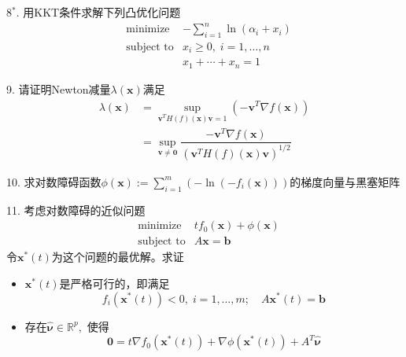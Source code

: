 
\begin{frame}

8$^*$. 用KKT条件求解下列凸优化问题
\begin{eqnarray*}
& \text{minimize} & -\sum\limits_{i=1}^n \ln(\alpha_i + x_i) \\
& \text{subject to} & x_i \ge 0,\; i=1,\ldots,n \\
& & x_1+\cdots+x_n = 1
\end{eqnarray*}

\vspace{1em}

9. 请证明Newton减量$\lambda(\mathbf{x})$满足
\begin{align*}
\lambda(\mathbf{x}) & = \sup\limits_{\mathbf{v}^T H(f)(\mathbf{x}) \mathbf{v} = 1} \left( -\mathbf{v}^T \nabla f(\mathbf{x}) \right) \\
& = \sup\limits_{\mathbf{v} \neq \mathbf{0}} \dfrac{-\mathbf{v}^T \nabla f(\mathbf{x})}{(\mathbf{v}^T H(f)(\mathbf{x}) \mathbf{v})^{1/2}}
\end{align*}

\end{frame}


\begin{frame}

10. 求对数障碍函数$\phi(\mathbf{x}) := \sum\limits_{i=1}^m \left( -\ln(-f_i(\mathbf{x})) \right)$的梯度向量与黑塞矩阵

\vspace{1em}

11. 考虑对数障碍的近似问题
\begin{eqnarray*}
& \text{minimize} & tf_0(\mathbf{x}) + \phi(\mathbf{x}) \\
& \text{subject to} & A\mathbf{x} = \mathbf{b}
\end{eqnarray*}
令$\mathbf{x}^*(t)$为这个问题的最优解。求证
\begin{itemize}
\item[(1)] $\mathbf{x}^*(t)$是严格可行的，即满足
$$f_i(\mathbf{x}^*(t)) < 0, \; i = 1,\ldots,m; \quad A\mathbf{x}^*(t) = \mathbf{b}$$
\item[(2)] 存在$\widehat{\boldsymbol\nu} \in \mathbb{R}^p,$ 使得
$$\mathbf{0} = t \nabla f_0(\mathbf{x}^*(t)) + \nabla \phi(\mathbf{x}^*(t)) + A^T \widehat{\boldsymbol\nu}$$
\end{itemize}

\end{frame}

